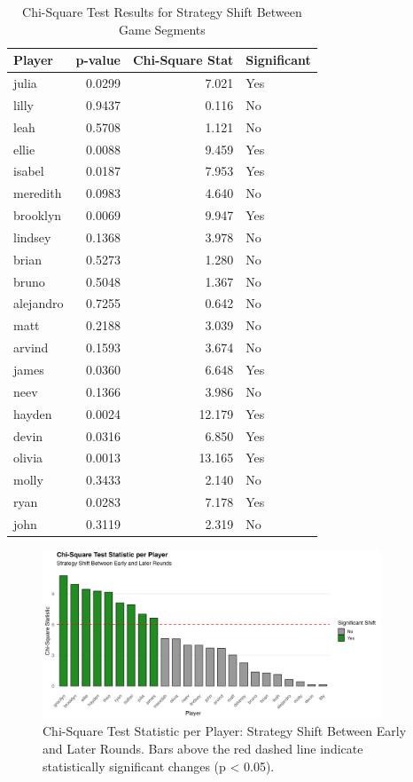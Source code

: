 \documentclass[12pt]{article}
\begin{document}
\begin{multicols}{2}
\newpage
\begin{table}[H]
\centering
\caption{Chi-Square Test Results for Strategy Shift Between Game Segments}
\label{tab:strategy_shift}
\begin{tabular}{lrrl}
\toprule
\textbf{Player} & \textbf{p-value} & \textbf{Chi-Square Stat} & \textbf{Significant} \\
\midrule
julia     & 0.0299 & 7.021 & Yes \\
lilly     & 0.9437 & 0.116 & No \\
leah      & 0.5708 & 1.121 & No \\
ellie     & 0.0088 & 9.459 & Yes \\
isabel    & 0.0187 & 7.953 & Yes \\
meredith  & 0.0983 & 4.640 & No \\
brooklyn  & 0.0069 & 9.947 & Yes \\
lindsey   & 0.1368 & 3.978 & No \\
brian     & 0.5273 & 1.280 & No \\
bruno     & 0.5048 & 1.367 & No \\
alejandro & 0.7255 & 0.642 & No \\
matt      & 0.2188 & 3.039 & No \\
arvind    & 0.1593 & 3.674 & No \\
james     & 0.0360 & 6.648 & Yes \\
neev      & 0.1366 & 3.986 & No \\
hayden    & 0.0024 & 12.179 & Yes \\
devin     & 0.0316 & 6.850 & Yes \\
olivia    & 0.0013 & 13.165 & Yes \\
molly     & 0.3433 & 2.140 & No \\
ryan      & 0.0283 & 7.178 & Yes \\
john      & 0.3119 & 2.319 & No \\
\bottomrule
\end{tabular}
\end{table}

\end{multicols}


\begin{figure}[H]
\centering
\includegraphics[width=0.9\textwidth]{figures/strategy_shift_chisq.png}
\caption{Chi-Square Test Statistic per Player: Strategy Shift Between Early and Later Rounds. Bars above the red dashed line indicate statistically significant changes (p < 0.05).}
\label{fig:strategy_shift_bar_appendix}
\end{figure}

\newpage


\end{document}
